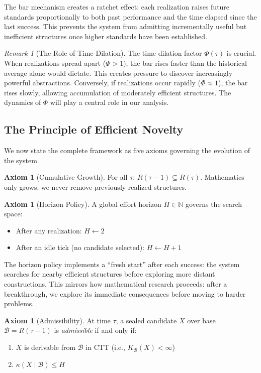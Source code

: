 \documentclass[11pt]{article}
\theoremstyle{definition}
\newtheorem{axiom}[theorem]{Axiom}
\theoremstyle{remark}
\newtheorem{remark}[theorem]{Remark}
\newcommand{\N}{\mathbb{N}}
\begin{document}
The bar mechanism creates a ratchet effect: each realization raises future standards proportionally to both past performance and the time elapsed since the last success. This prevents the system from admitting incrementally useful but inefficient structures once higher standards have been established.

\begin{remark}[The Role of Time Dilation]
The time dilation factor $\Phi(\tau)$ is crucial. When realizations spread apart ($\Phi > 1$), the bar rises faster than the historical average alone would dictate. This creates pressure to discover increasingly powerful abstractions. Conversely, if realizations occur rapidly ($\Phi \approx 1$), the bar rises slowly, allowing accumulation of moderately efficient structures. The dynamics of $\Phi$ will play a central role in our analysis.
\end{remark}

\subsection{The Principle of Efficient Novelty}

We now state the complete framework as five axioms governing the evolution of the system.

\begin{axiom}[Cumulative Growth]
\label{ax:cumulative}
For all $\tau$: $R(\tau - 1) \subseteq R(\tau)$. Mathematics only grows; we never remove previously realized structures.
\end{axiom}

\begin{axiom}[Horizon Policy]
\label{ax:horizon}
A global effort horizon $H \in \N$ governs the search space:
\begin{itemize}
\item After any realization: $H \leftarrow 2$
\item After an idle tick (no candidate selected): $H \leftarrow H + 1$
\end{itemize}
\end{axiom}

The horizon policy implements a ``fresh start'' after each success: the system searches for nearby efficient structures before exploring more distant constructions. This mirrors how mathematical research proceeds: after a breakthrough, we explore its immediate consequences before moving to harder problems.

\begin{axiom}[Admissibility]
\label{ax:admissibility}
At time $\tau$, a sealed candidate $X$ over base $\mathcal{B} = R(\tau - 1)$ is \emph{admissible} if and only if:
\begin{enumerate}
\item $X$ is derivable from $\mathcal{B}$ in CTT (i.e., $K_{\mathcal{B}}(X) < \infty$)
\item $\kappa(X \mid \mathcal{B}) \leq H$
\end{enumerate}
\end{axiom}
\end{document}
